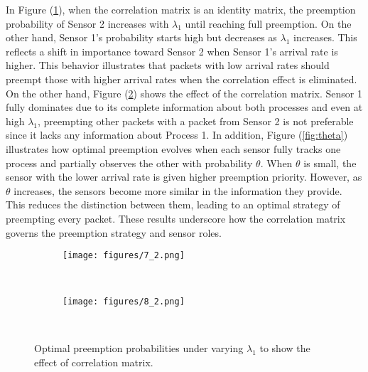 In Figure (\ref{fig:l1}), when the correlation matrix is an identity matrix, the preemption probability of Sensor 2 increases with $\lambda_1$ until reaching full preemption. On the other hand, Sensor 1’s probability starts high but decreases as $\lambda_1$ increases. This reflects a shift in importance toward Sensor 2 when Sensor 1’s arrival rate is higher. This behavior illustrates that packets with low arrival rates should preempt those with higher arrival rates when the correlation effect is eliminated. On the other hand, Figure (\ref{fig:l2}) shows the effect of the correlation matrix. Sensor 1 fully dominates due to its complete information about both processes and even at high \(\lambda_1\), preempting other packets with a packet from Sensor 2 is not preferable since it lacks any information about Process 1. In addition, Figure (\ref{fig:theta}) illustrates how optimal preemption evolves when each sensor fully tracks one process and partially observes the other with probability $\theta$. When $\theta$ is small, the sensor with the lower arrival rate is given higher preemption priority. However, as $\theta$ increases, the sensors become more similar in the information they provide. This reduces the distinction between them, leading to an optimal strategy of preempting every packet. These results underscore how the correlation matrix governs the preemption strategy and sensor roles. 






\begin{figure}[h!]
    \centering
    \begin{subfigure}[b]{0.24\textwidth}
        \centering
        \texttt{[image: figures/7\_2.png]}
        \caption{$\frac{}{}$ $\frac{}{}$$\frac{}{}$ $\frac{}{}$$\frac{}{}$$\frac{}{}$ $\frac{}{}$$\frac{}{}$ $\frac{}{}$}
        \label{fig:l1}
    \end{subfigure}
    \hfill
    \begin{subfigure}[b]{0.24\textwidth}
        \centering
        \texttt{[image: figures/8\_2.png]}
        \caption{$\frac{}{}$ $\frac{}{}$$\frac{}{}$ $\frac{}{}$$\frac{}{}$$\frac{}{}$ $\frac{}{}$$\frac{}{}$ $\frac{}{}$}
        \label{fig:l2}
    \end{subfigure}
    \caption{Optimal preemption probabilities under varying $\lambda_1$ to show the effect of correlation matrix.}
    \label{l_res}
    \vspace{-8pt}
\end{figure}


